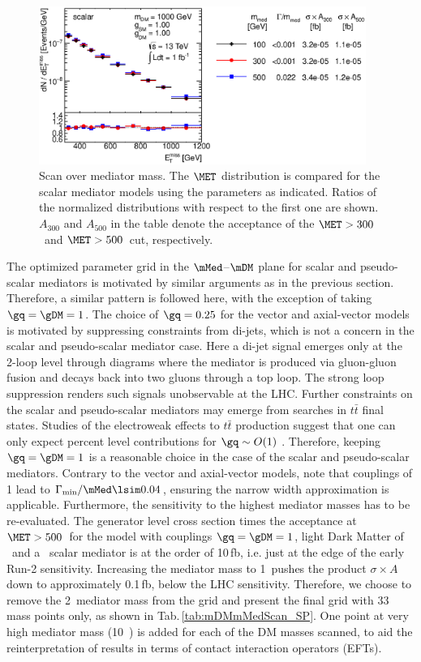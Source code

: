 \begin{figure}[!htpb]
\centering
\includegraphics[width=0.95\textwidth]{figures/monojet/scan_mMed_S_1000.eps}
\caption{Scan over mediator mass. The $\MET$ distribution is compared for the scalar mediator models using the parameters as indicated. Ratios of the normalized distributions with respect to the first one are shown. $A_{300}$ and $A_{500}$ in the table denote the acceptance of the $\MET>300$~\gev and $\MET>500$~\gev cut, respectively.}
\label{fig:monojet_scan_S_mMed1000}
\end{figure}


The optimized parameter grid in the $\mMed$--$\mDM$ plane for scalar and pseudo-scalar mediators is motivated by similar arguments as in the previous section. Therefore, a similar pattern is followed here, with the exception of taking $\gq=\gDM=1$. The choice of $\gq=0.25$ for the vector and axial-vector models is motivated by suppressing constraints from di-jets, which is not a concern in the scalar and pseudo-scalar mediator case. Here a di-jet signal emerges only at the 2-loop level through diagrams where the mediator is produced via gluon-gluon fusion and decays back into two gluons through a top loop. The strong loop suppression renders such signals unobservable at the LHC. Further constraints on the scalar and pseudo-scalar mediators may emerge from searches in $t\bar{t}$ final states. Studies of the electroweak effects to $t\bar{t}$ production suggest that one can only expect percent level contributions for $\gq \sim O(1)$ \cite{Haisch:2013fla}. Therefore, keeping $\gq=\gDM=1$ is a reasonable choice in the case of the scalar and pseudo-scalar mediators. Contrary to the vector and axial-vector models, note that couplings of 1 lead to $\Gamma_{\rm{min}}/\mMed \lsim 0.04$, ensuring the narrow width approximation is applicable. Furthermore, the sensitivity to the highest mediator masses has to be re-evaluated. The generator level cross section times the acceptance at $\MET>500$~\gev for the model with couplings $\gq=\gDM=1$, light Dark Matter of ~\gev and a ~\gev scalar mediator is at the order of 10\,fb, i.e. just at the edge of the early Run-2 sensitivity. Increasing the mediator mass to 1~\tev pushes the product $\sigma\times A$ down to approximately 0.1\,fb, below the LHC sensitivity. Therefore, we choose to remove the 2~\tev mediator mass from the grid and present the final grid with 33 mass points only, as shown in Tab.\,\ref{tab:mDMmMedScan_SP}. One point at very high mediator mass (10~\tev) is added for each of the DM masses scanned, to aid the reinterpretation of results in terms of contact interaction operators (EFTs).


